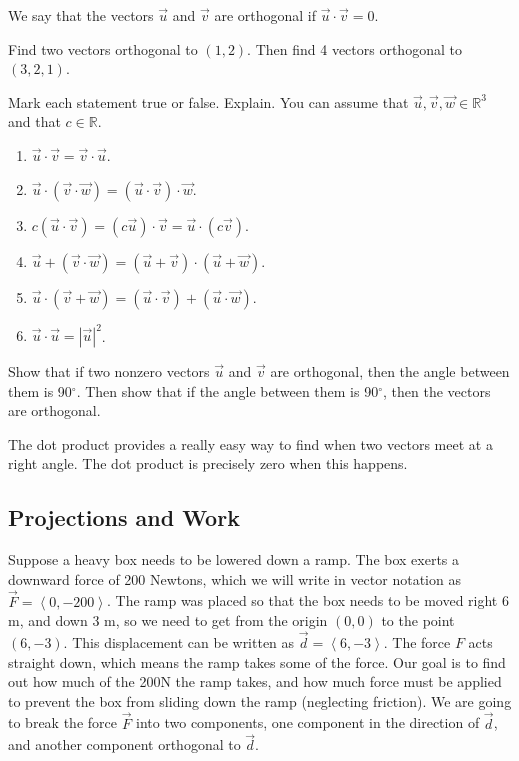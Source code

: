 \begin{definition}
We say that the vectors $\vec u$ and $\vec v$ are orthogonal if $\vec u\cdot \vec v=0$. 
\end{definition}

\begin{problem}
Find two vectors orthogonal to $(1,2)$.  Then find 4 vectors orthogonal to $(3,2,1)$.  
\end{problem}

\begin{problem}
Mark each statement true or false. Explain. You can assume that $\vec u,\vec v,\vec w\in\mathbb{R}^3$ and that $c\in\mathbb{R}$.
\begin{enumerate}
\item $\vec u\cdot \vec v=\vec v\cdot \vec u$. 
\item $\vec u\cdot (\vec v\cdot \vec w)=(\vec u\cdot\vec v)\cdot\vec w$. 
\item $c(\vec u\cdot \vec v)=(c\vec u)\cdot \vec v=\vec u\cdot (c\vec v)$. 
\item $\vec u+(\vec v\cdot \vec w)=(\vec u+\vec v)\cdot(\vec u+\vec w)$. 
\item $\vec u\cdot (\vec v+ \vec w)=(\vec u\cdot \vec v)+(\vec u\cdot\vec w)$. 
\item $\vec u\cdot \vec u= |\vec u|^2$. 
\end{enumerate}
\end{problem}

\begin{problem} 
Show that if two nonzero vectors $\vec u$ and $\vec v$ are orthogonal, then the angle between them is 90$^\circ$. Then show that if the angle between them is 90$^\circ$, then the vectors are orthogonal.
\end{problem}
The dot product provides a really easy way to find when two vectors meet at a right angle. The dot product is precisely zero when this happens.

\subsection{Projections and Work}
Suppose a heavy box needs to be lowered down a ramp.  
The box exerts a downward force of 200 Newtons, which we will write in vector notation as $\vec F=\left<0,-200\right>$. 
The ramp was placed so that the box needs to be moved right 6 m, and down 3 m, so we need to get from the origin $(0,0)$ to the point $(6,-3)$.  This displacement can be written as $\vec d=\left<6,-3\right>$. The force $F$ acts straight down, which means the ramp takes some of the force. Our goal is to find out how much of the 200N the ramp takes, and how much force must be applied to prevent the box from sliding down the ramp (neglecting friction). We are going to break the force $\vec F$ into two components, one component in the direction of $\vec d$, and another component orthogonal to $\vec d$. 

